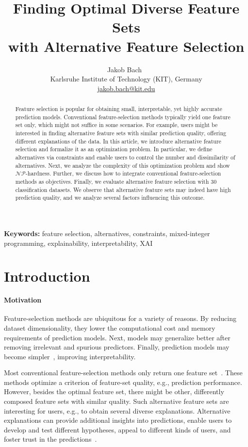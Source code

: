 \documentclass{article}
\title{
	Finding Optimal Diverse Feature Sets\texorpdfstring{\\}{ }with Alternative Feature Selection
}
\author{
	Jakob Bach~\orcidlink{0000-0003-0301-2798}\\
	\small Karlsruhe Institute of Technology (KIT), Germany\\
	\small \href{mailto:jakob.bach@kit.edu}{jakob.bach@kit.edu}
}
\date{} %
\theoremstyle{definition}
\begin{document}
\maketitle

\begin{abstract}
Feature selection is popular for obtaining small, interpretable, yet highly accurate prediction models.
Conventional feature-selection methods typically yield one feature set only, which might not suffice in some scenarios.
For example, users might be interested in finding alternative feature sets with similar prediction quality, offering different explanations of the data.
In this article, we introduce alternative feature selection and formalize it as an optimization problem.
In particular, we define alternatives via constraints and enable users to control the number and dissimilarity of alternatives.
Next, we analyze the complexity of this optimization problem and show $\mathcal{NP}$-hardness.
Further, we discuss how to integrate conventional feature-selection methods as objectives.
Finally, we evaluate alternative feature selection with 30 classification datasets.
We observe that alternative feature sets may indeed have high prediction quality, and we analyze several factors influencing this outcome.
\end{abstract}
%
\textbf{Keywords:} feature selection, alternatives, constraints, mixed-integer programming, explainability, interpretability, XAI

\section{Introduction}
\label{sec:afs:introduction}

\paragraph{Motivation}

Feature-selection methods are ubiquitous for a variety of reasons.
By reducing dataset dimensionality, they lower the computational cost and memory requirements of prediction models.
Next, models may generalize better after removing irrelevant and spurious predictors.
Finally, prediction models may become simpler~\cite{li2017feature}, improving interpretability.

Most conventional feature-selection methods only return one feature set~\cite{borboudakis2021extending}.
These methods optimize a criterion of feature-set quality, e.g., prediction performance.
However, besides the optimal feature set, there might be other, differently composed feature sets with similar quality.
Such alternative feature sets are interesting for users, e.g., to obtain several diverse explanations.
Alternative explanations can provide additional insights into predictions, enable users to develop and test different hypotheses, appeal to different kinds of users, and foster trust in the predictions~\cite{kim2021multi, wang2019designing}.
\end{document}
